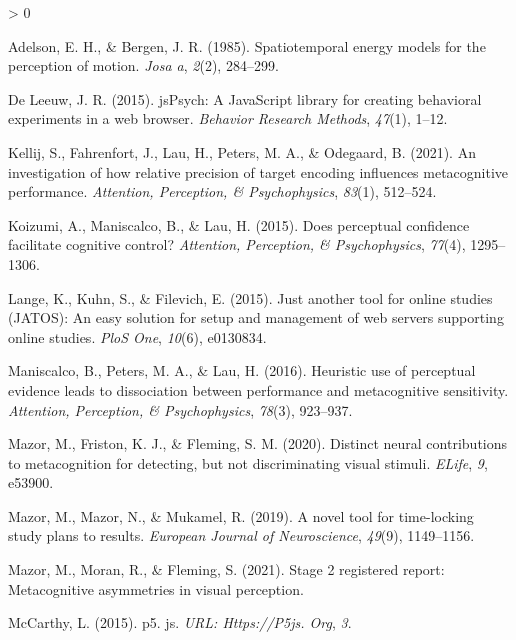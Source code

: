 \documentclass[
  english,
  man]{apa6}
\newlength{\cslhangindent}
\newenvironment{CSLReferences}[2] %
 {%
  \setlength{\parindent}{0pt}
  \ifodd #1 \everypar{\setlength{\hangindent}{\cslhangindent}}\ignorespaces\fi
  \ifnum #2 > 0
  \setlength{\parskip}{#2\baselineskip}
  \fi
 }%
 {}
\begin{document}
\hypertarget{refs}{}
\begin{CSLReferences}{1}{0}
\leavevmode\hypertarget{ref-adelson1985spatiotemporal}{}%
Adelson, E. H., \& Bergen, J. R. (1985). Spatiotemporal energy models for the perception of motion. \emph{Josa a}, \emph{2}(2), 284--299.

\leavevmode\hypertarget{ref-de2015jspsych}{}%
De Leeuw, J. R. (2015). jsPsych: A JavaScript library for creating behavioral experiments in a web browser. \emph{Behavior Research Methods}, \emph{47}(1), 1--12.

\leavevmode\hypertarget{ref-kellij2021investigation}{}%
Kellij, S., Fahrenfort, J., Lau, H., Peters, M. A., \& Odegaard, B. (2021). An investigation of how relative precision of target encoding influences metacognitive performance. \emph{Attention, Perception, \& Psychophysics}, \emph{83}(1), 512--524.

\leavevmode\hypertarget{ref-koizumi2015does}{}%
Koizumi, A., Maniscalco, B., \& Lau, H. (2015). Does perceptual confidence facilitate cognitive control? \emph{Attention, Perception, \& Psychophysics}, \emph{77}(4), 1295--1306.

\leavevmode\hypertarget{ref-lange2015jatos}{}%
Lange, K., Kuhn, S., \& Filevich, E. (2015). Just another tool for online studies (JATOS): An easy solution for setup and management of web servers supporting online studies. \emph{PloS One}, \emph{10}(6), e0130834.

\leavevmode\hypertarget{ref-maniscalco2016heuristic}{}%
Maniscalco, B., Peters, M. A., \& Lau, H. (2016). Heuristic use of perceptual evidence leads to dissociation between performance and metacognitive sensitivity. \emph{Attention, Perception, \& Psychophysics}, \emph{78}(3), 923--937.

\leavevmode\hypertarget{ref-mazor2020distinct}{}%
Mazor, M., Friston, K. J., \& Fleming, S. M. (2020). Distinct neural contributions to metacognition for detecting, but not discriminating visual stimuli. \emph{ELife}, \emph{9}, e53900.

\leavevmode\hypertarget{ref-mazor2019novel}{}%
Mazor, M., Mazor, N., \& Mukamel, R. (2019). A novel tool for time-locking study plans to results. \emph{European Journal of Neuroscience}, \emph{49}(9), 1149--1156.

\leavevmode\hypertarget{ref-mazor2021stage}{}%
Mazor, M., Moran, R., \& Fleming, S. (2021). Stage 2 registered report: Metacognitive asymmetries in visual perception.

\leavevmode\hypertarget{ref-mccarthy2015p5}{}%
McCarthy, L. (2015). p5. js. \emph{URL: Https://P5js. Org}, \emph{3}.


\end{CSLReferences}
\end{document}
